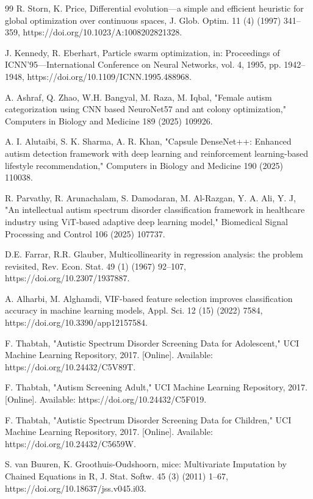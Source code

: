\documentclass[pdflatex,sn-vancouver-num]{sn-jnl}
\begin{document}
\begin{thebibliography}{99}
R. Storn, K. Price, Differential evolution---a simple and efficient heuristic for global optimization over continuous spaces, J. Glob. Optim. 11 (4) (1997) 341--359, https://doi.org/10.1023/A:1008202821328.

J. Kennedy, R. Eberhart, Particle swarm optimization, in: Proceedings of ICNN'95---International Conference on Neural Networks, vol. 4, 1995, pp. 1942--1948, https://doi.org/10.1109/ICNN.1995.488968.

A. Ashraf, Q. Zhao, W.H. Bangyal, M. Raza, M. Iqbal, "Female autism categorization using CNN based NeuroNet57 and ant colony optimization," Computers in Biology and Medicine 189 (2025) 109926.

A. I. Alutaibi, S. K. Sharma, A. R. Khan, "Capsule DenseNet++: Enhanced autism detection framework with deep learning and reinforcement learning-based lifestyle recommendation," Computers in Biology and Medicine 190 (2025) 110038.

R. Parvathy, R. Arunachalam, S. Damodaran, M. Al-Razgan, Y. A. Ali, Y. J, "An intellectual autism spectrum disorder classification framework in healthcare industry using ViT-based adaptive deep learning model," Biomedical Signal Processing and Control 106 (2025) 107737.

D.E. Farrar, R.R. Glauber, Multicollinearity in regression analysis: the problem revisited, Rev. Econ. Stat. 49 (1) (1967) 92--107, https://doi.org/10.2307/1937887.

A. Alharbi, M. Alghamdi, VIF-based feature selection improves classification accuracy in machine learning models, Appl. Sci. 12 (15) (2022) 7584, https://doi.org/10.3390/app12157584.

F. Thabtah, "Autistic Spectrum Disorder Screening Data for Adolescent," UCI Machine Learning Repository, 2017. [Online]. Available: https://doi.org/10.24432/C5V89T.

F. Thabtah, "Autism Screening Adult," UCI Machine Learning Repository, 2017. [Online]. Available: https://doi.org/10.24432/C5F019.

F. Thabtah, "Autistic Spectrum Disorder Screening Data for Children," UCI Machine Learning Repository, 2017. [Online]. Available: https://doi.org/10.24432/C5659W.

S. van Buuren, K. Groothuis-Oudshoorn, mice: Multivariate Imputation by Chained Equations in R, J. Stat. Softw. 45 (3) (2011) 1--67, https://doi.org/10.18637/jss.v045.i03.



\end{thebibliography}
\end{document}
